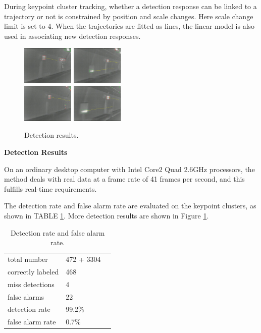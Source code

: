 During keypoint cluster tracking, whether a detection response can be linked to a trajectory or not is constrained by position and scale changes. Here scale change limit is set to 4. When the trajectories are fitted as lines, the linear model is also used in associating new detection responses.



\begin{figure}
{
\includegraphics[width=0.22\textwidth,bb=0 0 640 480]{17veriTrjimg00039.jpg}
}
{
\includegraphics[width=0.22\textwidth,bb=0 0 640 480]{8veriTrjimg00028.jpg}
}\\
{
\includegraphics[width=0.22\textwidth,bb=0 0 640 480]{19veriTrjimg00041.jpg}
}
{
\includegraphics[width=0.22\textwidth,bb=0 0 640 480]{3veriTrjimg00023.jpg}
}
\caption{Detection results.}
\label{fig:sixs}
\end{figure}

\textbf{Detection Results}

On an ordinary desktop computer with Intel Core2 Quad 2.6GHz processors, the method deals with real data at a frame rate of 41 frames per second, and this fulfills real-time requirements.


The detection rate and false alarm rate are evaluated on the keypoint clusters, as shown in TABLE \ref{tb:tb2}.
More detection results are shown in Figure \ref{fig:sixs}.
\begin{table}[h]
\centering
\begin{tabular}{lll}
     \hline
     \hline
    total number &	472 + 3304  \\
    correctly labeled &	468   \\
    miss detections &	4 &	  \\
    false alarms &	22    \\
    detection rate &	99.2\% &	  \\
    false alarm rate &	0.7\% &	   \\
   \hline
\end{tabular}
\caption{Detection rate and false alarm rate.}\label{tb:tb2}
\end{table}

